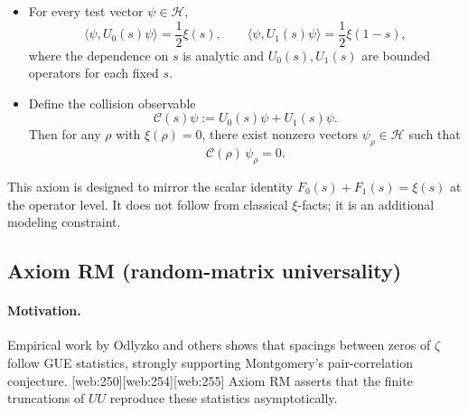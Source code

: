 \documentclass[11pt]{article}
\begin{document}
\begin{itemize}
  \item For every test vector $\psi\in\mathcal{H}$,
  \begin{equation}
    \langle \psi, U_0(s)\psi \rangle = \frac12\xi(s),\qquad
    \langle \psi, U_1(s)\psi \rangle = \frac12\xi(1-s),
  \end{equation}
  where the dependence on $s$ is analytic and $U_0(s),U_1(s)$ are bounded operators for each fixed $s$.
  \item Define the collision observable
  \begin{equation}
    \mathcal{C}(s)\psi := U_0(s)\psi + U_1(s)\psi.
  \end{equation}
  Then for any $\rho$ with $\xi(\rho)=0$, there exist nonzero vectors $\psi_\rho\in\mathcal{H}$ such that
  \begin{equation}
    \mathcal{C}(\rho)\,\psi_\rho = 0.
  \end{equation}
\end{itemize}

This axiom is designed to mirror the scalar identity $F_0(s)+F_1(s)=\xi(s)$ at the operator level.  It does not follow from classical $\xi$-facts; it is an additional modeling constraint.

\subsection{Axiom RM (random-matrix universality)}

\paragraph{Motivation.}
Empirical work by Odlyzko and others shows that spacings between zeros of $\zeta$ follow GUE statistics, strongly supporting Montgomery's pair-correlation conjecture. [web:250][web:254][web:255]  Axiom RM asserts that the finite truncations of $UU$ reproduce these statistics asymptotically.
\end{document}
